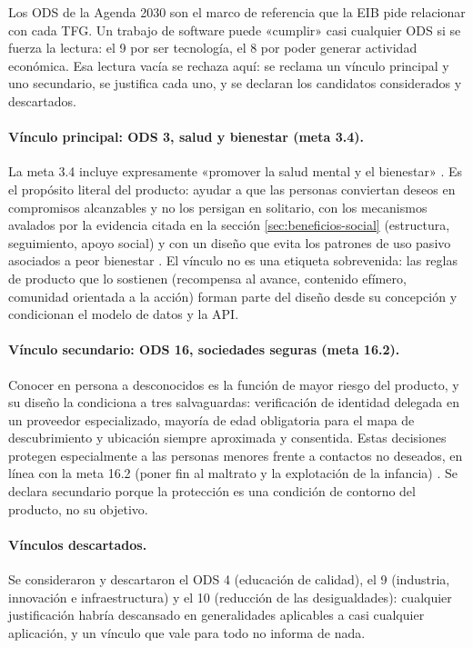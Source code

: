 Los \ac{ODS} de la Agenda 2030 \parencite{onu-agenda2030} son el marco de referencia que la \ac{EIB} pide relacionar con cada \ac{TFG}.
Un trabajo de software puede «cumplir» casi cualquier \ac{ODS} si se fuerza la lectura: el 9 por ser tecnología, el 8 por poder generar actividad económica.
Esa lectura vacía se rechaza aquí: se reclama un vínculo principal y uno secundario, se justifica cada uno, y se declaran los candidatos considerados y descartados.

\paragraph{Vínculo principal: \acs{ODS} 3, salud y bienestar (meta 3.4).}
La meta 3.4 incluye expresamente «promover la salud mental y el bienestar» \parencite{onu-agenda2030}.
Es el propósito literal del producto: ayudar a que las personas conviertan deseos en compromisos alcanzables y no los persigan en solitario, con los mecanismos avalados por la evidencia citada en la sección \ref{sec:beneficios-social} (estructura, seguimiento, apoyo social) y con un diseño que evita los patrones de uso pasivo asociados a peor bienestar \parencite{verduyn-sns}.
El vínculo no es una etiqueta sobrevenida: las reglas de producto que lo sostienen (recompensa al avance, contenido efímero, comunidad orientada a la acción) forman parte del diseño desde su concepción y condicionan el modelo de datos y la \ac{API}.

\paragraph{Vínculo secundario: \acs{ODS} 16, sociedades seguras (meta 16.2).}
Conocer en persona a desconocidos es la función de mayor riesgo del producto, y su diseño la condiciona a tres salvaguardas: verificación de identidad delegada en un proveedor especializado, mayoría de edad obligatoria para el mapa de descubrimiento y ubicación siempre aproximada y consentida.
Estas decisiones protegen especialmente a las personas menores frente a contactos no deseados, en línea con la meta 16.2 (poner fin al maltrato y la explotación de la infancia) \parencite{onu-agenda2030}.
Se declara secundario porque la protección es una condición de contorno del producto, no su objetivo.

\paragraph{Vínculos descartados.}
Se consideraron y descartaron el \ac{ODS} 4 (educación de calidad), el 9 (industria, innovación e infraestructura) y el 10 (reducción de las desigualdades): cualquier justificación habría descansado en generalidades aplicables a casi cualquier aplicación, y un vínculo que vale para todo no informa de nada.

